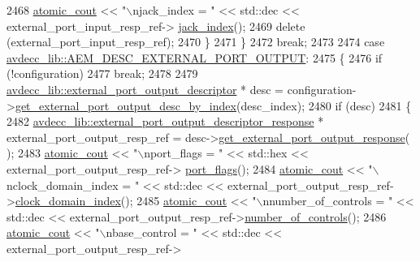 \begin{DoxyCode}
2468             \hyperlink{cmd__line_8h_a0bc38ccc65c79ba06c6fcd7b4bf554c3}{atomic\_cout} << \textcolor{stringliteral}{"\(\backslash\)njack\_index = "} << std::dec << external\_port\_input\_resp\_ref->
      \hyperlink{classavdecc__lib_1_1external__port__input__descriptor__response_aa4a1215ca41fe8d5d8bdd66a5742e93c}{jack\_index}();
2469             \textcolor{keyword}{delete} (external\_port\_input\_resp\_ref);
2470         \}
2471     \}
2472     \textcolor{keywordflow}{break};
2473 
2474     \textcolor{keywordflow}{case} \hyperlink{namespaceavdecc__lib_ac7b7d227e46bc72b63ee9e9aae15902fa60159ed7fb6c5bf542208f134c202c67}{avdecc\_lib::AEM\_DESC\_EXTERNAL\_PORT\_OUTPUT}:
2475     \{
2476         \textcolor{keywordflow}{if} (!configuration)
2477             \textcolor{keywordflow}{break};
2478 
2479         \hyperlink{classavdecc__lib_1_1external__port__output__descriptor}{avdecc\_lib::external\_port\_output\_descriptor} * desc = 
      configuration->\hyperlink{classavdecc__lib_1_1configuration__descriptor_a58f09b090b126e803061158bf1e22c5e}{get\_external\_port\_output\_desc\_by\_index}(desc\_index);
2480         \textcolor{keywordflow}{if} (desc)
2481         \{
2482             \hyperlink{classavdecc__lib_1_1external__port__output__descriptor__response}{avdecc\_lib::external\_port\_output\_descriptor\_response}
       * external\_port\_output\_resp\_ref = desc->\hyperlink{classavdecc__lib_1_1external__port__output__descriptor_affbd1deb9db87132131a3ca9e7eb8c3f}{get\_external\_port\_output\_response}(
      );
2483             \hyperlink{cmd__line_8h_a0bc38ccc65c79ba06c6fcd7b4bf554c3}{atomic\_cout} << \textcolor{stringliteral}{"\(\backslash\)nport\_flags = "} << std::hex << external\_port\_output\_resp\_ref->
      \hyperlink{classavdecc__lib_1_1external__port__output__descriptor__response_a66bad2f1317cba04f0ea271f7181b58f}{port\_flags}();
2484             \hyperlink{cmd__line_8h_a0bc38ccc65c79ba06c6fcd7b4bf554c3}{atomic\_cout} << \textcolor{stringliteral}{"\(\backslash\)nclock\_domain\_index = "} << std::dec << 
      external\_port\_output\_resp\_ref->\hyperlink{classavdecc__lib_1_1external__port__output__descriptor__response_aab7f93d403d8b73f8f4a8fb7c61ecded}{clock\_domain\_index}();
2485             \hyperlink{cmd__line_8h_a0bc38ccc65c79ba06c6fcd7b4bf554c3}{atomic\_cout} << \textcolor{stringliteral}{"\(\backslash\)nnumber\_of\_controls = "} << std::dec << 
      external\_port\_output\_resp\_ref->\hyperlink{classavdecc__lib_1_1external__port__output__descriptor__response_a5accf7abc7d231a0767ad5cac68b8b39}{number\_of\_controls}();
2486             \hyperlink{cmd__line_8h_a0bc38ccc65c79ba06c6fcd7b4bf554c3}{atomic\_cout} << \textcolor{stringliteral}{"\(\backslash\)nbase\_control = "} << std::dec << external\_port\_output\_resp\_ref->

\end{DoxyCode}
